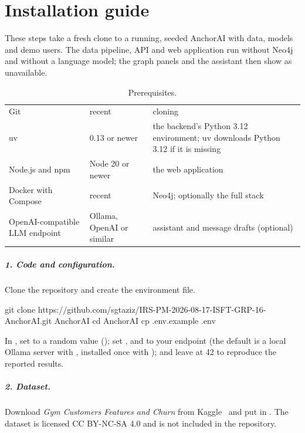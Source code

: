 \chapter{Installation guide}
\label{app:install}

These steps take a fresh clone to a running, seeded AnchorAI with data, models and demo users. The data pipeline, API and web application run without Neo4j and without a language model; the graph panels and the assistant then show as unavailable.

\begin{table}[H]
  \caption{Prerequisites.}
  \label{tab:prereq}
  \begin{tabularx}{\linewidth}{@{}l l L@{}}
    \toprule
     &  &  \\
    \midrule
    Git & recent & cloning \\
    uv & 0.13 or newer & the backend's Python 3.12 environment; uv downloads Python 3.12 if it is missing \\
    Node.js and npm & Node 20 or newer & the web application \\
    Docker with Compose & recent & Neo4j; optionally the full stack \\
    OpenAI-compatible LLM endpoint & Ollama, OpenAI or similar & assistant and message drafts (optional) \\
    \bottomrule
  \end{tabularx}
\end{table}

\paragraph{1. Code and configuration.} Clone the repository and create the environment file.
\begin{shell}
git clone https://github.com/sgtaziz/IRS-PM-2026-08-17-ISFT-GRP-16-AnchorAI.git AnchorAI
cd AnchorAI
cp .env.example .env
\end{shell}
In , set  to a random value (); set ,  and  to your endpoint (the default is a local Ollama server with , installed once with ); and leave  at 42 to reproduce the reported results.

\paragraph{2. Dataset.} Download \emph{Gym Customers Features and Churn} from Kaggle~\cite{vinueza-gym} and put  in . The dataset is licensed CC BY-NC-SA 4.0 and is not included in the repository.

